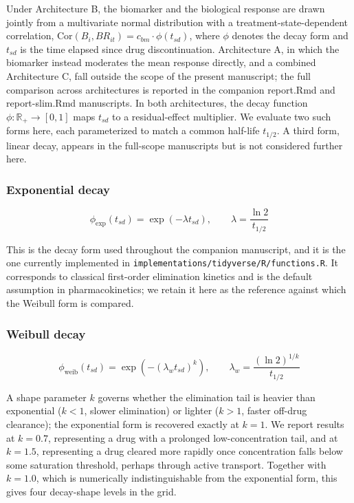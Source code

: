\documentclass[
  11pt,
]{article}
\begin{document}
Under Architecture B, the biomarker and the biological response are
drawn jointly from a multivariate normal distribution with a
treatment-state-dependent correlation,
\(\text{Cor}(B_i, BR_{it}) = c_{bm} \cdot \phi(t_{sd})\), where \(\phi\)
denotes the decay form and \(t_{sd}\) is the time elapsed since drug
discontinuation. Architecture A, in which the biomarker instead
moderates the mean response directly, and a combined Architecture C,
fall outside the scope of the present manuscript; the full
comparison across architectures is reported in the companion
report.Rmd and report-slim.Rmd manuscripts. In both architectures,
the decay function \(\phi : \mathbb{R}_+ \to [0, 1]\) maps \(t_{sd}\) to
a residual-effect multiplier. We evaluate two such forms here, each
parameterized to match a common half-life \(t_{1/2}\). A third form,
linear decay, appears in the full-scope manuscripts but is not
considered further here.

\subsubsection{Exponential decay}\label{exponential-decay}

\[
\phi_{\text{exp}}(t_{sd}) =
  \exp\left(-\lambda t_{sd}\right), \qquad
  \lambda = \frac{\ln 2}{t_{1/2}}
\]

This is the decay form used throughout the companion manuscript, and
it is the one currently implemented in
\texttt{implementations/tidyverse/R/functions.R}. It corresponds to
classical first-order elimination kinetics and is the default
assumption in pharmacokinetics; we retain it here as the reference
against which the Weibull form is compared.

\subsubsection{Weibull decay}\label{weibull-decay}

\[
\phi_{\text{weib}}(t_{sd}) =
  \exp\left(-\left(\lambda_w t_{sd}\right)^{k}\right), \qquad
  \lambda_w = \frac{(\ln 2)^{1/k}}{t_{1/2}}
\]

A shape parameter \(k\) governs whether the elimination tail is
heavier than exponential (\(k < 1\), slower elimination) or lighter
(\(k > 1\), faster off-drug clearance); the exponential form is
recovered exactly at \(k = 1\). We report results at \(k = 0.7\),
representing a drug with a prolonged low-concentration tail, and at
\(k = 1.5\), representing a drug cleared more rapidly once
concentration falls below some saturation threshold, perhaps through
active transport. Together with \(k = 1.0\), which is numerically
indistinguishable from the exponential form, this gives four
decay-shape levels in the grid.
\end{document}
